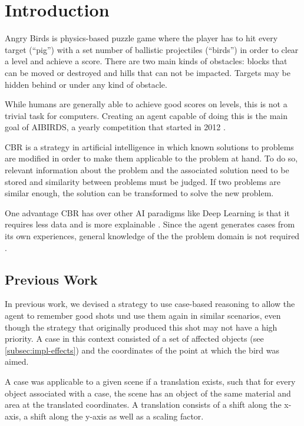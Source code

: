\section{Introduction}\label{sec:intro}

Angry Birds is physics-based puzzle game where the player has to hit every target (``pig'') with a set number of ballistic projectiles (``birds'') in order to clear a level and achieve a score.
There are two main kinds of obstacles: blocks that can be moved or destroyed and hills that can not be impacted. Targets may be hidden behind or under any kind of obstacle.

While humans are generally able to achieve good scores on levels, this is not a trivial task for computers.
Creating an agent capable of doing this is the main goal of AIBIRDS, a yearly competition that started in 2012 \cite{Renz2015AIBIRDSTA}.

\ac{CBR} is a strategy in artificial intelligence in which known solutions to problems are modified in order to make them applicable to the problem at hand.
To do so, relevant information about the problem and the associated solution need to be stored and similarity between problems must be judged.
If two problems are similar enough, the solution can be transformed to solve the new problem.

One advantage \ac{CBR} has over other AI paradigms like Deep Learning is that it requires less data and is more explainable \cite{explainable-https://doi.org/10.48550/arxiv.1710.04806}. Since the agent generates cases from its own experiences, general knowledge of the the problem domain is not required \cite{CBR-issues-variations-approaches}.


\subsection{Previous Work}\label{subsec:previous}
In previous work, we devised a strategy to use case-based reasoning to allow the agent to remember good shots und use them again in similar scenarios, even though the strategy that originally produced this shot may not have a high priority.
A case in this context consisted of a set of affected objects (see \ref{subsec:impl-effects}) and the coordinates of the point at which the bird was aimed.

A case was applicable to a given scene if a translation exists, such that for every object associated with a case, the scene has an object of the same material and area at the translated coordinates. A translation consists of a shift along the x-axis, a shift along the y-axis as well as a scaling factor.

